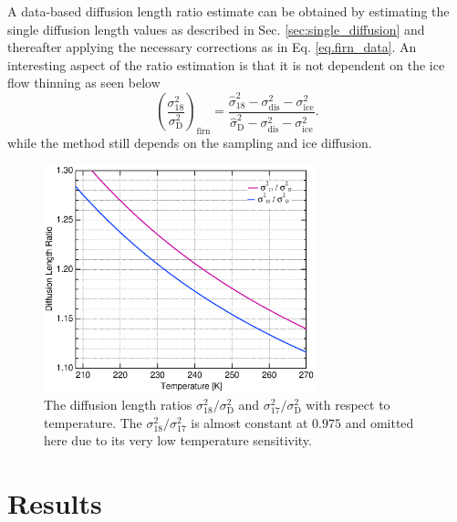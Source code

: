 \documentclass[11pt, draftcls, onecolumn]{IEEEtran} %
\numberwithin{equation}{section}
\numberwithin{table}{section}
\numberwithin{figure}{section}
\begin{document}
A data-based diffusion length ratio estimate can be obtained by estimating the single 
diffusion length values as described in Sec. \ref{sec:single_diffusion}
and thereafter applying the necessary corrections as in Eq. \ref{eq.firn_data}. 
An interesting aspect of the ratio estimation is that it is not dependent on the
ice flow thinning as seen below
\begin{equation} 
\left( \frac{\sigma^2_{18}}{\sigma^2_\mathrm{D}} \right)_{\mathrm{firn}}  =
\frac{ \hat{\sigma}^2_{18} - \sigma^2_{\mathrm{dis}} - \sigma^2_{\mathrm{ice}} }{\hat{\sigma}^2_{\mathrm{D}} - 
	\sigma^2_{\mathrm{dis}} - \sigma^2_{\mathrm{ice}} }.
\end{equation}
while the method still depends on the sampling and ice diffusion.
\begin{figure}[]	
	\vspace*{2mm}	
	\begin{center}		
		\includegraphics[width=0.7\textwidth]{Figure_10}		
		\caption{The diffusion length ratios $\sigma^2_{18}/\sigma^2_{\mathrm{D}}$ and $\sigma^2_{17}/\sigma^2_{\mathrm{D}}$
			with respect to temperature.
			The $\sigma^2_{18}/\sigma^2_{17}$ is almost constant at $0.975$ and omitted here due to its very low temperature sensitivity.} 		
		\label{fig:diff_len_ratio}	
	\end{center}
\end{figure}




\section{Results}\label{sec:results}
\end{document}
